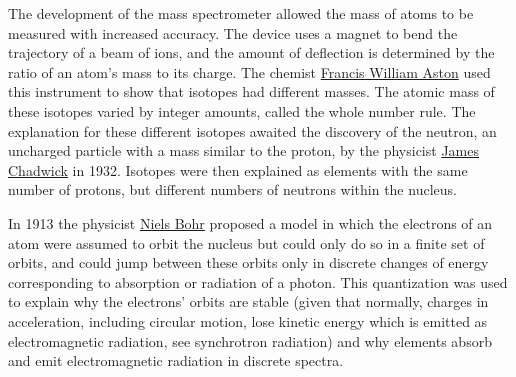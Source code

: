 The development of the mass spectrometer allowed the mass of atoms to be measured with increased accuracy. The device uses a magnet to bend the trajectory of a beam of ions, and the amount of deflection is determined by the ratio of an atom's mass to its charge. The chemist \href{https://en.wikipedia.org/wiki/Francis_William_Aston}{Francis William Aston} used this instrument to show that isotopes had different masses. The atomic mass of these isotopes varied by integer amounts, called the whole number rule. The explanation for these different isotopes awaited the discovery of the neutron, an uncharged particle with a mass similar to the proton, by the physicist \href{https://en.wikipedia.org/wiki/James_Chadwick}{James Chadwick} in 1932. Isotopes were then explained as elements with the same number of protons, but different numbers of neutrons within the nucleus.

In 1913 the physicist \href{https://en.wikipedia.org/wiki/Niels_Bohr}{Niels Bohr} proposed a model in which the electrons of an atom were assumed to orbit the nucleus but could only do so in a finite set of orbits, and could jump between these orbits only in discrete changes of energy corresponding to absorption or radiation of a photon. This quantization was used to explain why the electrons' orbits are stable (given that normally, charges in acceleration, including circular motion, lose kinetic energy which is emitted as electromagnetic radiation, see synchrotron radiation) and why elements absorb and emit electromagnetic radiation in discrete spectra.




